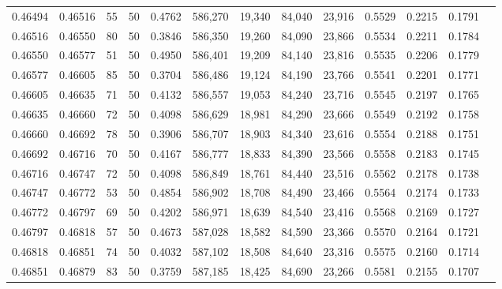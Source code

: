 \begin{tabular}{rrrrrrrrrrrrr}
0.46494 & 0.46516 &    55 &  50 &                                     0.4762 & 586,270 &  19,340 &  84,040 &  23,916 & 0.5529 & 0.2215 & 0.1791 \\
0.46516 & 0.46550 &    80 &  50 &                                     0.3846 & 586,350 &  19,260 &  84,090 &  23,866 & 0.5534 & 0.2211 & 0.1784 \\
0.46550 & 0.46577 &    51 &  50 &                                     0.4950 & 586,401 &  19,209 &  84,140 &  23,816 & 0.5535 & 0.2206 & 0.1779 \\
0.46577 & 0.46605 &    85 &  50 &                                     0.3704 & 586,486 &  19,124 &  84,190 &  23,766 & 0.5541 & 0.2201 & 0.1771 \\
0.46605 & 0.46635 &    71 &  50 &                                     0.4132 & 586,557 &  19,053 &  84,240 &  23,716 & 0.5545 & 0.2197 & 0.1765 \\
0.46635 & 0.46660 &    72 &  50 &                                     0.4098 & 586,629 &  18,981 &  84,290 &  23,666 & 0.5549 & 0.2192 & 0.1758 \\
0.46660 & 0.46692 &    78 &  50 &                                     0.3906 & 586,707 &  18,903 &  84,340 &  23,616 & 0.5554 & 0.2188 & 0.1751 \\
0.46692 & 0.46716 &    70 &  50 &                                     0.4167 & 586,777 &  18,833 &  84,390 &  23,566 & 0.5558 & 0.2183 & 0.1745 \\
0.46716 & 0.46747 &    72 &  50 &                                     0.4098 & 586,849 &  18,761 &  84,440 &  23,516 & 0.5562 & 0.2178 & 0.1738 \\
0.46747 & 0.46772 &    53 &  50 &                                     0.4854 & 586,902 &  18,708 &  84,490 &  23,466 & 0.5564 & 0.2174 & 0.1733 \\
0.46772 & 0.46797 &    69 &  50 &                                     0.4202 & 586,971 &  18,639 &  84,540 &  23,416 & 0.5568 & 0.2169 & 0.1727 \\
0.46797 & 0.46818 &    57 &  50 &                                     0.4673 & 587,028 &  18,582 &  84,590 &  23,366 & 0.5570 & 0.2164 & 0.1721 \\
0.46818 & 0.46851 &    74 &  50 &                                     0.4032 & 587,102 &  18,508 &  84,640 &  23,316 & 0.5575 & 0.2160 & 0.1714 \\
0.46851 & 0.46879 &    83 &  50 &                                     0.3759 & 587,185 &  18,425 &  84,690 &  23,266 & 0.5581 & 0.2155 & 0.1707 \\

\end{tabular}
